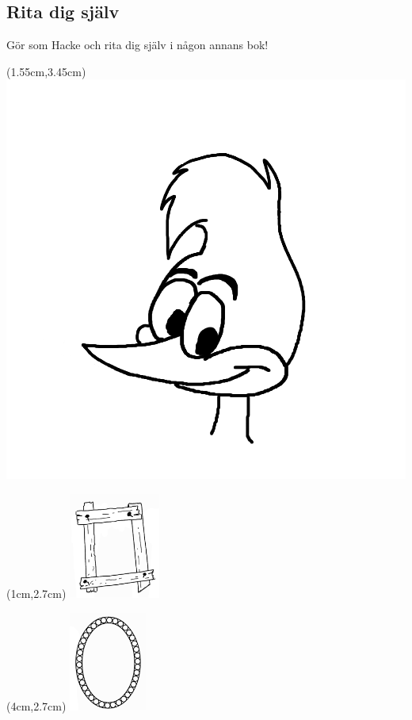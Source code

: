 {
\newpage
\subsection*{Rita dig själv}


Gör som Hacke och rita dig själv i någon annans bok!

\begin{textblock*}{6cm}(1.55cm,3.45cm) %
  \includegraphics[width=2 cm]{./bilder/ramar/hacke_portratt_2.png} %
\end{textblock*}



\begin{textblock*}{6cm}(1cm,2.7cm) %
  \includegraphics[width=3cm]{./bilder/ramar/Ram4.png} %
\end{textblock*}

\begin{textblock*}{6cm}(4cm,2.7cm) %
  \includegraphics[width=2.6cm]{./bilder/ramar/Ram5.png} %
\end{textblock*}

}
